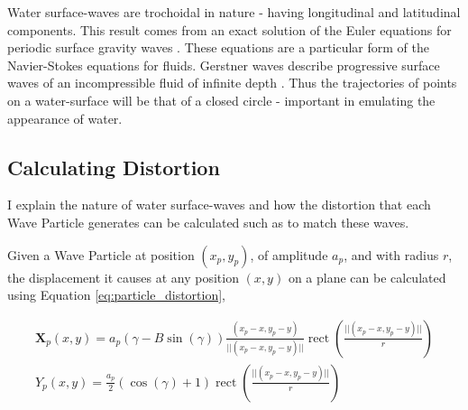 \documentclass[12pt,a4paper,twoside]{report}
\DeclareMathOperator{\rect}{rect}
\begin{document}
Water surface-waves are trochoidal in nature - having longitudinal and
latitudinal components. This result comes from an exact solution of the Euler
equations for periodic surface gravity waves \cite{Gerstner1802}. These
equations are a particular form of the Navier-Stokes equations for fluids.
Gerstner waves describe progressive surface waves of an incompressible fluid of
infinite depth \cite{Gerstner1802}. Thus the trajectories of points on a
water-surface will be that of a closed circle - important in emulating the
appearance of water.





\subsection{Calculating Distortion}

I explain the nature of water surface-waves and how the distortion that
each Wave Particle generates can be calculated such as to match these waves.

Given a Wave Particle at position $(x_p, y_p)$, of amplitude $a_p$, and with
radius $r$, the displacement it causes at any position $(x, y)$ on a plane can
be calculated using Equation \ref{eq:particle_distortion},


\begin{equation} \label{eq:particle_distortion}
\begin{split}
\bm{X}_p(x,y)=a_p(\gamma-B\sin{(\gamma)})\frac{(x_p-x,y_p-y)}{||(x_p-x,y_p-y)||}\rect(\frac{||(x_p-x,y_p-y)||}{r}) \\
Y_p(x,y)=\frac{a_p}{2}(\cos{(\gamma)} + 1)\rect(\frac{||(x_p-x,y_p-y)||}{r})
\end{split}
\end{equation}
\end{document}
